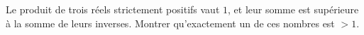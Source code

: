 Le produit de trois réels strictement positifs vaut $1$, et leur somme est supérieure à la somme de leurs inverses. Montrer qu'exactement un de ces nombres est $> 1$.
